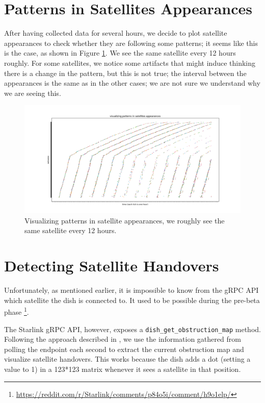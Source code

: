 \documentclass[IN,11pt,twoside,openright,idp,english]{tumthesis}
\begin{document}
\section{Patterns in Satellites Appearances}

After having collected data for several hours, we decide to plot satellite appearances to check whether they are following some patterns; it seems like this is the case, as shown in Figure \ref{fig:vis-sat-pat}. We see the same satellite every 12 hours roughly. For some satellites, we notice some artifacts that might induce thinking there is a change in the pattern, but this is not true; the interval between the appearances is the same as in the other cases; we are not sure we understand why we are seeing this.

\begin{figure}
    \centering
    \includegraphics[width=1.0\columnwidth]{img/visualizing-how-long-satellites-are-visible-for.png}
    \caption{Visualizing patterns in satellite appearances, we roughly see the same satellite every 12 hours.}
    \label{fig:vis-sat-pat}
\end{figure}

\section{Detecting Satellite Handovers}

Unfortunately, as mentioned earlier, it is impossible to know from the gRPC API which satellite the dish is connected to. It used to be possible during the pre-beta phase \footnote{\url{https://reddit.com/r/Starlink/comments/p84o5i/comment/h9o1elp/}}.

The Starlink gRPC API, however, exposes a \texttt{dish\_get\_obstruction\_map} method. Following the approach described in \cite{izhikevich2023democratizing}, we use the information gathered from polling the endpoint each second to extract the current obstruction map and visualize satellite handovers. This works because the dish adds a dot (setting a value to 1) in a 123*123 matrix whenever it sees a satellite in that position. 
\end{document}

